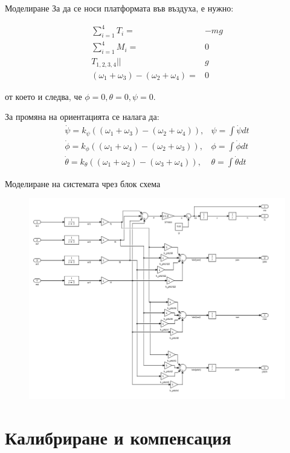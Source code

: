 \documentclass[handout]{beamer}
\begin{document}
\begin{frame}{Моделиране}
	За да се носи платформата във въздуха, е нужно:

\begin{align*}
		\sum_{i=1}^{4} T_i  =& -mg \\
		\sum_{i=1}^{4} M_i  =& 0 \\
		T_{1,2,3,4} ||& g \\
		( \omega_1 + \omega_3 ) - ( \omega_2 + \omega_4 ) =& 0 
\end{align*}

от което и следва, че \(\phi=0,\theta=0,\psi=0\).

\end{frame}
\begin{frame}
	За промяна на ориентацията се налага да:
\begin{align*}
		\dot{\psi} = k_{\psi}((\omega_1+\omega_3)-(\omega_2 + \omega_4)) ,& \psi = \int \dot{\psi}dt\\
		\dot{\phi} = k_{\phi}((\omega_1 + \omega_4) - (\omega_2+\omega_3 )) ,& \phi = \int \dot{\phi}dt\\
		\dot{\theta} = k_{\theta}((\omega_1+\omega_2) - (\omega_3 +\omega_4)) ,& \theta = \int \dot{\theta}dt
\end{align*}
\end{frame}

\begin{frame}{Моделиране на системата чрез блок схема}
	\begin{figure}[!h]
		\centering
		\includegraphics[width=0.7\columnwidth]{Images/quadrotor_simulink.png}
	\end{figure}
\end{frame}


\section{Калибриране и компенсация}
\end{document}
